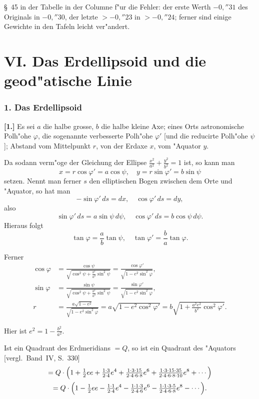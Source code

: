 \documentclass[12pt,a4paper]{article}
\theoremstyle{plain}
\theoremstyle{definition}
\theoremstyle{remark}
\begin{document}
\S~45 in der Tabelle in der Columne f"ur die Fehler: der erste Werth
$-0{,}''31$ des Originals in $-0{,}''30$, der letzte $>-0{,}''23$ in $>-0{,}''24$;
ferner sind einige Gewichte in den Tafeln leicht ver"andert.

\newpage

\part*{VI. Das Erdellipsoid und die geod"atische Linie}

\section*{1. Das Erdellipsoid}

\textbf{[1.]} Es sei $a$ die halbe grosse, $b$ die halbe kleine Axe; eines Orts astronomische Polh"ohe $\varphi$, die sogenannte verbesserte Polh"ohe $\varphi'$ [und die reducirte Polh"ohe $\psi$]; Abstand vom Mittelpunkt $r$, von der Erdaxe $x$, vom "Aquator $y$.

Da sodann verm"oge der Gleichung der Ellipse $\frac{x^2}{a^2} + \frac{y^2}{b^2} = 1$ ist, so kann man
\[
x = r\cos\varphi' = a\cos\psi, \quad y = r\sin\varphi' = b\sin\psi
\]
setzen. Nennt man ferner $s$ den elliptischen Bogen zwischen dem Orte und
"Aquator, so hat man
\[
-\sin\varphi'\,ds = dx, \quad \cos\varphi'\,ds = dy,
\]
also
\[
\sin\varphi'\,ds = a\sin\psi\,d\psi, \quad \cos\varphi'\,ds = b\cos\psi\,d\psi.
\]
Hieraus folgt
\[
\tan\varphi = \frac{a}{b}\tan\psi, \quad \tan\varphi' = \frac{b}{a}\tan\varphi.
\]

Ferner
\begin{align*}
\cos\varphi &= \frac{\cos\psi}{\sqrt{\cos^2\psi + \frac{b^2}{a^2}\sin^2\psi}} = \frac{\cos\varphi'}{\sqrt{1 - e^2\sin^2\varphi}}, \\
\sin\varphi &= \frac{\sin\psi}{\sqrt{\cos^2\psi + \frac{b^2}{a^2}\sin^2\psi}} = \frac{\sin\varphi'}{\sqrt{1 - e^2\sin^2\varphi}}, \\
r &= \frac{a\sqrt{1 - e^2}}{\sqrt{1 - e^2\sin^2\varphi}} = a\sqrt{1 - e^2\cos^2\varphi'} = b\sqrt{1 + \frac{a^2e^2}{b^2}\cos^2\varphi'}.
\end{align*}

Hier ist $e^2 = 1 - \frac{b^2}{a^2}$.

Ist ein Quadrant des Erdmeridians $= Q$, so ist ein Quadrant des "Aquators
[vergl.~Band~IV, S.~330]
\begin{multline*}
= Q\cdot\Bigl(1 + \tfrac{1}{2}ee + \tfrac{1\cdot 3}{2\cdot 4}e^4 + \tfrac{1\cdot 3\cdot 15}{2\cdot 4\cdot 6\cdot 8}e^6 + \tfrac{1\cdot 3\cdot 15\cdot 35}{2\cdot 4\cdot 6\cdot 8\cdot 10}e^8 + \cdots\Bigr)\\
= Q\cdot\Bigl(1 - \tfrac{1}{2}ee - \tfrac{1\cdot 1}{2\cdot 4}e^4 - \tfrac{1\cdot 1\cdot 3}{2\cdot 4\cdot 6}e^6 - \tfrac{1\cdot 1\cdot 3\cdot 5}{2\cdot 4\cdot 6\cdot 8}e^8 - \cdots\Bigr).
\end{multline*}
\end{document}
